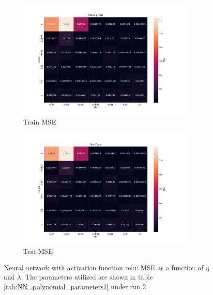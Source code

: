 \begin{figure}[htpb]
\begin{subfigure}{.5\textwidth}
  \centering
  \includegraphics[width=1.1\linewidth]{Figures/PartB/train_relu_MSE(eta,lmb)}
  \caption{Train MSE}
  \label{fig:train_relu_MSE-eta-lmb-}
\end{subfigure}%
\begin{subfigure}{.5\textwidth}
  \centering
  \includegraphics[width=1.1\linewidth]{Figures/PartB/test_relu_MSE(eta,lmb)}
  \caption{Test MSE}
  \label{fig:test_relu_MSE-eta-lmb-}
\end{subfigure}
\caption{Neural network with activation function relu: MSE as a function of \(\eta \) and \(\lambda \).
 The parameters utilized are shown in table \ref{tab:NN_polynomial_parameters1} under run 2.}
\label{fig:relu_MSE}
\end{figure}

